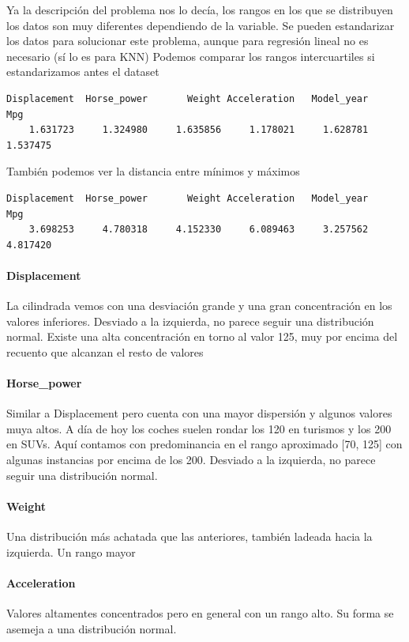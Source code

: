 Ya la descripción del problema nos lo decía, los rangos en los que se distribuyen los datos son muy diferentes dependiendo de la variable. Se pueden estandarizar los datos para solucionar este problema, aunque para regresión lineal no es necesario (sí lo es para KNN)
\vspace{\baselineskip}
Podemos comparar los rangos intercuartiles si estandarizamos antes el dataset

\begin{verbatim}
Displacement  Horse_power       Weight Acceleration   Model_year          Mpg 
    1.631723     1.324980     1.635856     1.178021     1.628781     1.537475 
\end{verbatim}

También podemos ver la distancia entre mínimos y máximos

\begin{verbatim}
Displacement  Horse_power       Weight Acceleration   Model_year          Mpg 
    3.698253     4.780318     4.152330     6.089463     3.257562     4.817420 
\end{verbatim}

\paragraph{Displacement}
La cilindrada vemos con una desviación grande y una gran concentración en los valores inferiores. Desviado a la izquierda, no parece seguir una distribución normal. Existe una alta concentración en torno al valor 125, muy por encima del recuento que alcanzan el resto de valores

\paragraph{Horse\_power}
Similar a Displacement pero cuenta con una mayor dispersión y algunos valores muya altos. A día de hoy los coches suelen rondar los 120 en turismos y los 200 en SUVs. Aquí contamos con predominancia en el rango aproximado {[}70, 125{]} con algunas instancias por encima de los 200.
Desviado a la izquierda, no parece seguir una distribución normal.


\paragraph{Weight}
Una distribución más achatada que las anteriores, también ladeada hacia la izquierda. Un rango mayor

\paragraph{Acceleration}
Valores altamentes concentrados pero en general con un rango alto. Su forma se asemeja a una distribución normal.


